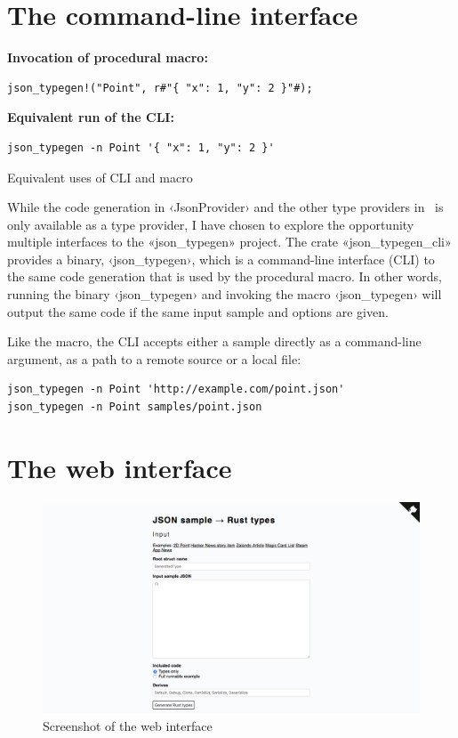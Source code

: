 \section{The command-line interface}

\begin{listing}[ht!]
\textbf{Invocation of procedural macro:}
\begin{verbatim}
json_typegen!("Point", r#"{ "x": 1, "y": 2 }"#);
\end{verbatim}
\vspace{5mm}

\textbf{Equivalent run of the CLI:}
\begin{verbatim}
json_typegen -n Point '{ "x": 1, "y": 2 }'
\end{verbatim}
\caption{Equivalent uses of CLI and macro}
\label{lst:cli-and-macro}
\end{listing}

While the code generation in ‹JsonProvider› and the other type providers in \fsharpdata\ is only available as a type provider, I have chosen to explore the opportunity multiple interfaces to the «json_typegen» project. The crate «json_typegen_cli» provides a binary, ‹json_typegen›, which is a command-line interface (CLI) to the same code generation that is used by the procedural macro. In other words, running the binary ‹json_typegen› and invoking the macro ‹json_typegen› will output the same code if the same input sample and options are given.

Like the macro, the CLI accepts either a sample directly as a command-line argument, as a path to a remote source or a local file:

\begin{verbatim}
json_typegen -n Point 'http://example.com/point.json'
json_typegen -n Point samples/point.json
\end{verbatim}


\section{The web interface}

\begin{figure}[ht!]
\includegraphics[width=\textwidth]{json_typegen_web}
\hspace*{-1.5in} %
\caption{Screenshot of the web interface}
\label{fig:web-screenshot}
\end{figure}

